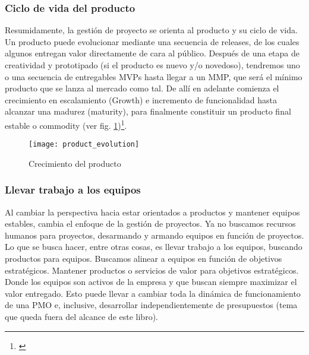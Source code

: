 \subsubsection{Ciclo de vida del producto}

Resumidamente, la gestión de proyecto se orienta al producto y su ciclo de vida. Un producto puede evolucionar mediante una secuencia de releases, de los cuales algunos entregan valor directamente de cara al público. Después de una etapa de creatividad y prototipado (si el producto es nuevo y/o novedoso), tendremos uno o una secuencia de entregables MVPs hasta llegar a un MMP, que será el mínimo producto que se lanza al mercado como tal. De allí en adelante comienza el crecimiento en escalamiento (Growth) e incremento de funcionalidad hasta alcanzar una madurez (maturity), para finalmente constituir un producto final estable o commodity (ver fig. \ref{fig:product_evolution})\footnote{\cite{Greg-Gehrich-2012}}.

\begin{figure}[h]
  \centering
  \texttt{[image: product\_evolution]}
  \caption{Crecimiento del producto}
  \centering
  \label{fig:product_evolution} %
\end{figure}
\FloatBarrier %

\subsubsection{Llevar trabajo a los equipos}

Al cambiar la perspectiva hacia estar orientados a productos y mantener equipos estables, cambia el enfoque de la gestión de proyectos. Ya no buscamos recursos humanos para proyectos, desarmando y armando equipos en función de proyectos. Lo que se busca hacer, entre otras cosas, es llevar trabajo a los equipos, buscando productos para equipos. Buscamos alinear a equipos en función de objetivos estratégicos. Mantener productos o servicios de valor para objetivos estratégicos. Donde los equipos son activos de la empresa y que buscan siempre maximizar el valor entregado. Esto puede llevar a cambiar toda la dinámica de funcionamiento de una PMO e, inclusive, desarrollar independientemente de presupuestos (tema que queda fuera del alcance de este libro).

